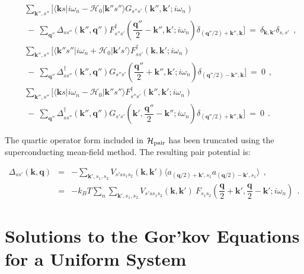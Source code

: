 \documentclass[uplatex,a4j,12pt,dvipdfmx]{jsarticle}
\begin{document}
\begin{eqnarray}
	&&
	\sum_{\bm{k}'',s''}
	\Big[
		\langle \bm{k} s | i \omega_{n} - \mathcal{H}_{0} | \bm{k}'' s'' \rangle
		G_{s''s'}(\bm{k}'' , \bm{k}' ; i \omega_{n} )
		\\ && \ - \
		\sum_{\bm{q}''}
		\Delta_{s s''}(\bm{k}'',\bm{q}'') F_{s'' s'}^{\dagger}
		(\dfrac{\bm{q}''}{2} - \bm{k}'' , \bm{k}' ; i \omega_{n})
		\delta_{(\bm{q}''/2)+\bm{k}'',\bm{k}}
		\Big]
	\ = \
	\delta_{\bm{k},\bm{k}'}
	\delta_{s,s'}
	\ \ , \\[2mm]
	&&
	\sum_{\bm{k}'',s''}
	\Big[
		\langle \bm{k}'' s'' | i \omega_{n} + \mathcal{H}_{0} | \bm{k}' s' \rangle
		F_{ss'}^{\dagger}(\bm{k} , \bm{k}' ; i \omega_{n} )
		\\ && \ - \
		\sum_{\bm{q}''}
		\Delta_{s s''}^{\dagger}(\bm{k}'',\bm{q}'') G_{s'' s'}
		(\dfrac{\bm{q}''}{2} + \bm{k}'' , \bm{k}' ; i \omega_{n})
		\delta_{(\bm{q}''/2)-\bm{k}'',\bm{k}}
		\Big]
	\ = \
	0
	\ \ , \\[2mm]
	&&
	\sum_{\bm{k}'',s''}
	\Big[
		\langle \bm{k} s | i \omega_{n} - \mathcal{H}_{0} | \bm{k}'' s'' \rangle
		F_{s''s'}^{\dagger}(\bm{k}'' , \bm{k}' ; i \omega_{n} )
		\\ && \ - \
		\sum_{\bm{q}''}
		\Delta_{s s''}^{\dagger}(\bm{k}'',\bm{q}'') G_{s' s'}
		(\bm{k}' , \dfrac{\bm{q}''}{2} - \bm{k}'' ; i \omega_{n})
		\delta_{(\bm{q}''/2)+\bm{k}'',\bm{k}}
		\Big]
	\ = \
	0
	\ \ .
	\label{eqn:B7}
\end{eqnarray}

The quartic operator form included in $\mathcal{H}_{\rm pair}$ has been truncated using the superconducting mean-field method. The resulting pair potential is:

\begin{eqnarray}
	\Delta_{ss'}(\bm{k},\bm{q})
	&=&
	- \sum_{\bm{k}' , s_{1} , s_{2}}
	V_{s' s s_{1} s_{2}}(\bm{k},\bm{k}')
	\langle
	a_{(\bm{q}/2) + \bm{k}' , s_{1}}
	a_{(\bm{q}/2) - \bm{k}' , s_{1}}
	\rangle
	\ \ ,
	\nonumber \\[2mm] &=&
	- k_{B} T
	\sum_{n}
	\sum_{\bm{k}' , s_{1} , s_{2}}
	V_{s' s s_{1} s_{2}}(\bm{k},\bm{k}')
	\ \!
	F_{s_{1} s_{2}}(\dfrac{\bm{q}}{2} + \bm{k}' , \dfrac{\bm{q}}{2} - \bm{k}' ; i \omega_{n})
	\ \ .
	\label{eqn:B8}
\end{eqnarray}

\section{Solutions to the Gor'kov Equations for a Uniform System}
\end{document}

